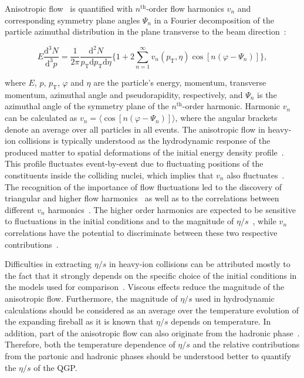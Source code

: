 Anisotropic flow~\cite{Ollitrault:1992bk} is quantified with $n^{\mathrm{th}}$-order flow harmonics $v_n$ and corresponding symmetry plane angles $\Psi_n$ in a Fourier decomposition of the particle azimuthal distribution in the plane transverse to the beam direction~\cite{Voloshin:1994mz,Poskanzer:1998yz}:

\begin{equation}
E\frac{\mathrm{d}^3N}{\mathrm{d^3}{p}} = \frac{1}{2\pi}\frac{\mathrm{d}^2N}{p_{\mathrm{T}}\mathrm{d}p_{\mathrm{T}}\mathrm{d}\eta} \Big\{1 + 2\sum_{n=1}^{\infty} v_n(p_{\mathrm{T}},\eta) \cos[n(\varphi - \Psi_n)]\Big\},
\label{Eq:Fourier}
\end{equation}

\noindent where $E$, $p$, $p_{\mathrm{T}}$, $\varphi$ and $\eta$ are the particle's energy, momentum, transverse momentum, azimuthal angle and pseudorapidity, respectively, and $\Psi_n$ is the azimuthal angle of the symmetry plane of the $n^{\mathrm{th}}$-order harmonic. Harmonic $v_n$ can be calculated as $v_{n} = \langle{\cos[n(\varphi - \Psi_n)]}\rangle$, where the angular brackets denote an average over all particles in all events.
The anisotropic flow in heavy-ion collisions is typically understood as the hydrodynamic response of the produced matter to spatial deformations of the initial energy density profile~\cite{Floerchinger:2013tya}.
This profile fluctuates event-by-event due to fluctuating positions of the constituents inside the colliding nuclei, which implies that $v_n$ also fluctuates~\cite{Miller:2003kd,Alver:2006wh}.
The recognition of the importance of flow fluctuations led to the discovery of triangular and higher flow harmonics~\cite{Alver:2010gr,ALICE:2011ab} as well as to the correlations between different $v_{n}$ harmonics~\cite{Niemi:2012aj,Aad:2014fla}.
The higher order harmonics are expected to be sensitive to fluctuations in the initial conditions and to the magnitude of $\eta/s$~\cite{Alver:2010dn,Luzum:2012wu}, while $v_{n}$ correlations have the potential to discriminate between these two respective contributions~\cite{Niemi:2012aj}.

Difficulties in extracting $\eta/s$ in heavy-ion collisions can be attributed mostly to the fact that it strongly depends on the specific choice of the initial conditions in the models used for comparison~\cite{Romatschke:2007mq,Luzum:2012wu,Shen:2011zc}.
Viscous effects reduce the magnitude of the anisotropic flow. Furthermore, the magnitude of $\eta/s$ used in hydrodynamic calculations should be considered as an average over the temperature evolution of the expanding fireball as it is known that $\eta/s$ depends on temperature. 
In addition, part of the anisotropic flow can also originate from the hadronic phase~\cite{Bozek:2011ua,Rose:2014fba,Ryu:2015vwa}. Therefore,
both the temperature dependence of $\eta/s$ and the relative contributions from the partonic and hadronic phases should be understood better to quantify the $\eta/s$ of the QGP.

